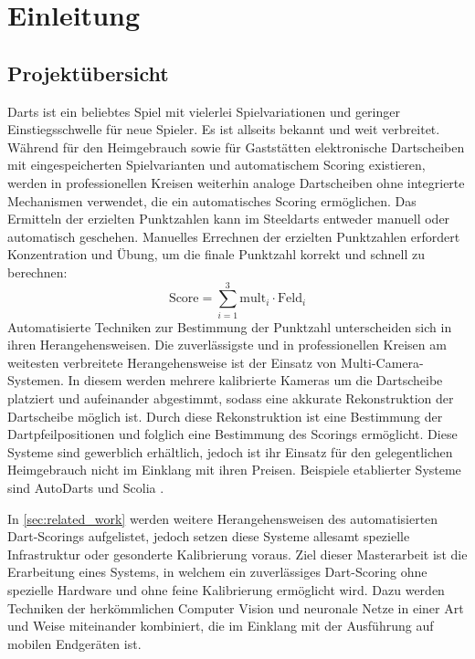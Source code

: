 
\chapter{Einleitung}
\label{cha:einleitung}



\section{Projektübersicht}
\label{sec:projektuebersicht}

Darts ist ein beliebtes Spiel mit vielerlei Spielvariationen und geringer Einstiegsschwelle für neue Spieler. Es ist allseits bekannt und weit verbreitet. Während für den Heimgebrauch sowie für Gaststätten elektronische Dartscheiben mit eingespeicherten Spielvarianten und automatischem Scoring existieren, werden in professionellen Kreisen weiterhin analoge Dartscheiben ohne integrierte Mechanismen verwendet, die ein automatisches Scoring ermöglichen. Das Ermitteln der erzielten Punktzahlen kann im Steeldarts entweder manuell oder automatisch geschehen. Manuelles Errechnen der erzielten Punktzahlen erfordert Konzentration und Übung, um die finale Punktzahl korrekt und schnell zu berechnen:
\[ \text{Score} = \sum_{i=1}^{3} \text{mult}_i \cdot \text{Feld}_i \]
Automatisierte Techniken zur Bestimmung der Punktzahl unterscheiden sich in ihren Herangehensweisen. Die zuverlässigste und in professionellen Kreisen am weitesten verbreitete Herangehensweise ist der Einsatz von Multi-Camera-Systemen. In diesem werden mehrere kalibrierte Kameras um die Dartscheibe platziert und aufeinander abgestimmt, sodass eine akkurate Rekonstruktion der Dartscheibe möglich ist. Durch diese Rekonstruktion ist eine Bestimmung der Dartpfeilpositionen und folglich eine Bestimmung des Scorings ermöglicht. Diese Systeme sind gewerblich erhältlich, jedoch ist ihr Einsatz für den gelegentlichen Heimgebrauch nicht im Einklang mit ihren Preisen. Beispiele etablierter Systeme sind AutoDarts \cite{autodarts} und Scolia \cite{scoliadarts}.

In \autoref{sec:related_work} werden weitere Herangehensweisen des automatisierten Dart-Scorings aufgelistet, jedoch setzen diese Systeme allesamt spezielle Infrastruktur oder gesonderte Kalibrierung voraus. Ziel dieser Masterarbeit ist die Erarbeitung eines Systems, in welchem ein zuverlässiges Dart-Scoring ohne spezielle Hardware und ohne feine Kalibrierung ermöglicht wird. Dazu werden Techniken der herkömmlichen Computer Vision und neuronale Netze in einer Art und Weise miteinander kombiniert, die im Einklang mit der Ausführung auf mobilen Endgeräten ist.

